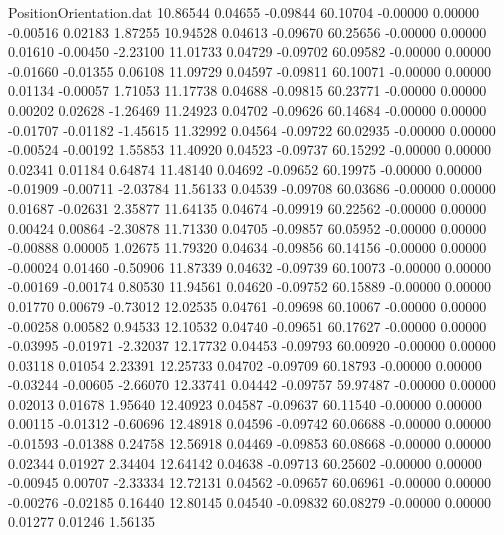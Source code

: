 \begin{filecontents}{PositionOrientation.dat}
  10.86544    0.04655   -0.09844    60.10704   -0.00000    0.00000   -0.00516    0.02183    1.87255
  10.94528    0.04613   -0.09670    60.25656   -0.00000    0.00000    0.01610   -0.00450   -2.23100
  11.01733    0.04729   -0.09702    60.09582   -0.00000    0.00000   -0.01660   -0.01355    0.06108
  11.09729    0.04597   -0.09811    60.10071   -0.00000    0.00000    0.01134   -0.00057    1.71053
  11.17738    0.04688   -0.09815    60.23771   -0.00000    0.00000    0.00202    0.02628   -1.26469
  11.24923    0.04702   -0.09626    60.14684   -0.00000    0.00000   -0.01707   -0.01182   -1.45615
  11.32992    0.04564   -0.09722    60.02935   -0.00000    0.00000   -0.00524   -0.00192    1.55853
  11.40920    0.04523   -0.09737    60.15292   -0.00000    0.00000    0.02341    0.01184    0.64874
  11.48140    0.04692   -0.09652    60.19975   -0.00000    0.00000   -0.01909   -0.00711   -2.03784
  11.56133    0.04539   -0.09708    60.03686   -0.00000    0.00000    0.01687   -0.02631    2.35877
  11.64135    0.04674   -0.09919    60.22562   -0.00000    0.00000    0.00424    0.00864   -2.30878
  11.71330    0.04705   -0.09857    60.05952   -0.00000    0.00000   -0.00888    0.00005    1.02675
  11.79320    0.04634   -0.09856    60.14156   -0.00000    0.00000   -0.00024    0.01460   -0.50906
  11.87339    0.04632   -0.09739    60.10073   -0.00000    0.00000   -0.00169   -0.00174    0.80530
  11.94561    0.04620   -0.09752    60.15889   -0.00000    0.00000    0.01770    0.00679   -0.73012
  12.02535    0.04761   -0.09698    60.10067   -0.00000    0.00000   -0.00258    0.00582    0.94533
  12.10532    0.04740   -0.09651    60.17627   -0.00000    0.00000   -0.03995   -0.01971   -2.32037
  12.17732    0.04453   -0.09793    60.00920   -0.00000    0.00000    0.03118    0.01054    2.23391
  12.25733    0.04702   -0.09709    60.18793   -0.00000    0.00000   -0.03244   -0.00605   -2.66070
  12.33741    0.04442   -0.09757    59.97487   -0.00000    0.00000    0.02013    0.01678    1.95640
  12.40923    0.04587   -0.09637    60.11540   -0.00000    0.00000    0.00115   -0.01312   -0.60696
  12.48918    0.04596   -0.09742    60.06688   -0.00000    0.00000   -0.01593   -0.01388    0.24758
  12.56918    0.04469   -0.09853    60.08668   -0.00000    0.00000    0.02344    0.01927    2.34404
  12.64142    0.04638   -0.09713    60.25602   -0.00000    0.00000   -0.00945    0.00707   -2.33334
  12.72131    0.04562   -0.09657    60.06961   -0.00000    0.00000   -0.00276   -0.02185    0.16440
  12.80145    0.04540   -0.09832    60.08279   -0.00000    0.00000    0.01277    0.01246    1.56135

\end{filecontents}
